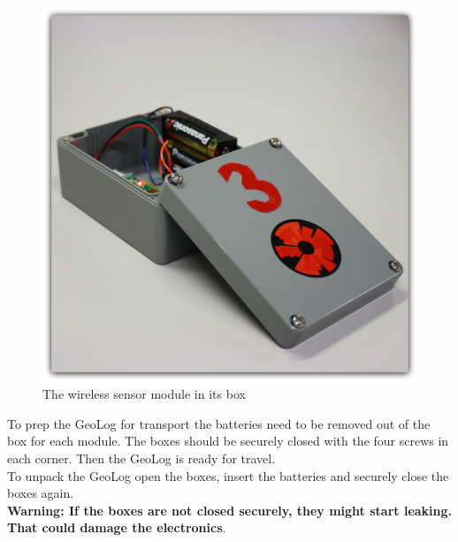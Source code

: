 \begin{figure}[H]
\centering
\includegraphics[width=0.6\linewidth]{graphics/Wixel_sensor.jpg}
\caption{The wireless sensor module in its box\label{fig:Wixel_sensor}}
\end{figure}
To prep the GeoLog for transport the batteries need to be removed out of the box for each module. The boxes should be securely closed with the four screws in each corner. Then the GeoLog is ready for travel.\\
To unpack the GeoLog open the boxes, insert the batteries and securely close the boxes again.\\
\textbf{Warning: If the boxes are not closed securely, they might start leaking. That could damage the electronics}.

